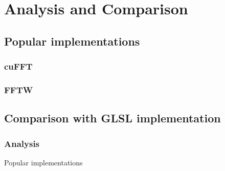 \documentclass[
  oneside,
  11pt, a4paper,
  footinclude=true,
  headinclude=true,
  cleardoublepage=empty
]{scrbook}
\begin{document}
\chapter{Analysis and Comparison}
\section{Popular implementations}
\subsection{cuFFT}
\subsection{FFTW}
\section{Comparison with GLSL implementation}
\subsection{Analysis}
Popular implementations


\cleardoublepage



\printindex

    
    \appendix
    \renewcommand\chaptername{Appendix}





\end{document}
